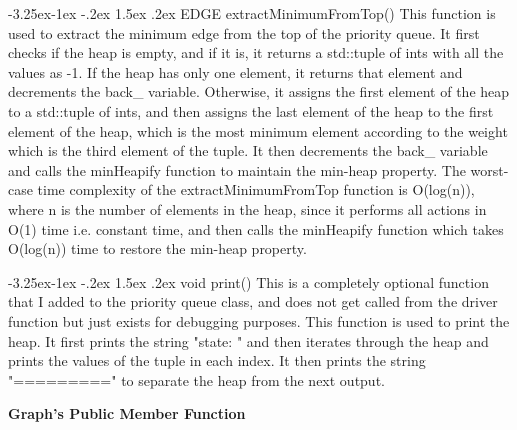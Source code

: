 \documentclass[a4paper]{article}
\makeatletter
\renewcommand\paragraph{\@startsection{paragraph}{4}{\z@}%
                                     {-3.25ex\@plus -1ex \@minus -.2ex}%
                                     {1.5ex \@plus .2ex}%
                                     {\normalfont\normalsize\bfseries}}
\makeatother
\begin{document}
			\paragraph{{\color{azure} EDGE } {\color{draculapurple}extractMinimumFromTop}()}
				This function is used to extract the minimum edge from the top of the priority queue. It first checks if the heap is empty, 
				and if it is, it returns a {\color{draculapurple}std::tuple} of {\color{draculapurple}int}s with all the values as -1. 
				If the heap has only one element, it returns that element and decrements the {\color{Turquoise}back\_} variable. 
				Otherwise, it assigns the first element of the heap to a {\color{draculapurple}std::tuple} of {\color{draculapurple}int}s, 
				and then assigns the last element of the heap to the first element of the heap, which is the most minimum element according to the weight which is the third element of the tuple.
				It then decrements the {\color{Turquoise}back\_} variable and calls the {\color{draculapurple}minHeapify} function to maintain the min-heap property.
				The worst-case time complexity of the {\color{draculapurple}extractMinimumFromTop} function is {\color{lightblue}O(log(n))}, where n 
				is the number of elements in the heap, since it performs all actions in {\color{lightblue}O(1)} time i.e. constant time, and
				then calls the {\color{draculapurple}minHeapify} function which takes {\color{lightblue}O(log(n))} time to restore the min-heap property.

			\paragraph{{\color{orange}void} {\color{draculapurple}print}()}
				This is a completely optional function that I added to the priority queue class, and does not get called from the driver function but just exists for debugging purposes.
				This function is used to print the heap. It first prints the string "state: " and then iterates through the heap and prints the values of the tuple in each index.
				It then prints the string "=========" to separate the heap from the next output.
			
	\begin{center}
		\noindent\hrulefill\raisebox{-.3\ht\strutbox} {\textbf{\Large{Graph's Public Member Function}}}\hrulefill
	\end{center}
\end{document}

